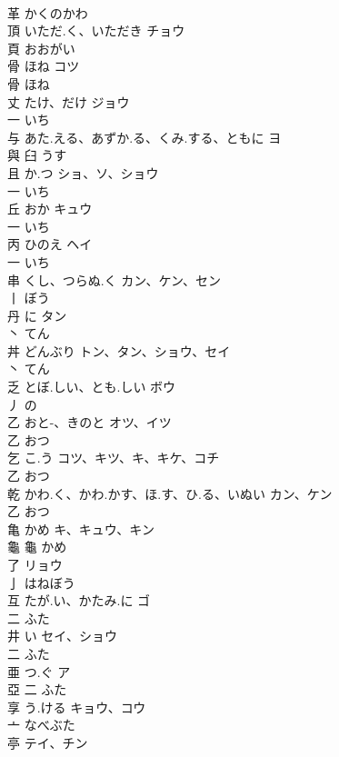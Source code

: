 \documentclass[8pt]{extreport}
\begin{document}
\begin{CJK}{UTF8}{min}
\\	革		かくのかわ		
\\	頂	いただ.く、いただき	チョウ	
\\	頁		おおがい		
\\	骨	ほね	コツ	
\\	骨		ほね		
\\	丈	たけ、だけ	ジョウ	
\\	一		いち		
\\	与	あた.える、あずか.る、くみ.する、ともに	ヨ	
\\	與	臼		うす		
\\	且	か.つ	ショ、ソ、ショウ	
\\	一		いち		
\\	丘	おか	キュウ	
\\	一		いち		
\\	丙	ひのえ	ヘイ	
\\	一		いち		
\\	串	くし、つらぬ.く	カン、ケン、セン	
\\	丨		ぼう		
\\	丹	に	タン	
\\	丶		てん		
\\	丼	どんぶり	トン、タン、ショウ、セイ	
\\	丶		てん		
\\	乏	とぼ.しい、とも.しい	ボウ	
\\	丿		の		
\\	乙	おと-、きのと	オツ、イツ	
\\	乙		おつ		
\\	乞	こ.う	コツ、キツ、キ、キケ、コチ	
\\	乙		おつ		
\\	乾	かわ.く、かわ.かす、ほ.す、ひ.る、いぬい	カン、ケン	
\\	乙		おつ		
\\	亀	かめ	キ、キュウ、キン	
\\	龜	龜		かめ		
\\	了		リョウ	
\\	亅		はねぼう		
\\	互	たが.い、かたみ.に	ゴ	
\\	二		ふた		
\\	井	い	セイ、ショウ	
\\	二		ふた		
\\	亜	つ.ぐ	ア	
\\	亞	二		ふた		
\\	享	う.ける	キョウ、コウ	
\\	亠		なべぶた		
\\	亭		テイ、チン	

\end{CJK}
\end{document}
